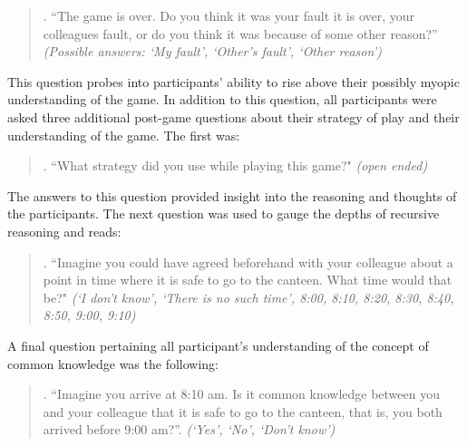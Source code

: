 \documentclass[a4paper,superscriptaddress,nofootinbib]{revtex4}
\begin{document}
\begin{quote}
. ``The game is over. Do you think it was your fault it is over, your colleagues fault, or do
you think it was because of some other reason?'' \textit{(Possible answers: `My fault', `Other's fault', `Other reason')}
\end{quote}
This question probes into participants' ability to rise above their possibly myopic understanding of the game. In addition to this question, all participants were asked three additional post-game questions about their strategy of play and their understanding of the game. The first was:
\begin{quote}
. ``What strategy did you use while playing this game?" \textit{(open ended)}
\end{quote}
The answers to this question provided insight into the reasoning and thoughts of the participants. The next question was used to gauge the depths of recursive reasoning and reads:
\begin{quote}
. ``Imagine you could have agreed beforehand with your colleague about a point in time where it is safe to go to the canteen. What time would that be?" \textit{(`I don't know', `There is no such time', 8:00, 8:10, 8:20, 8:30, 8:40, 8:50, 9:00, 9:10)}
\end{quote}
A final question pertaining all participant's understanding of the concept of common knowledge was the following:
\begin{quote}
. ``Imagine you arrive at 8:10 am. Is it common knowledge between you and your colleague that it is safe to go to the canteen, that is, you both arrived before 9:00 am?''. \textit{(`Yes', `No', `Don't know')}
\end{quote}
\end{document}
